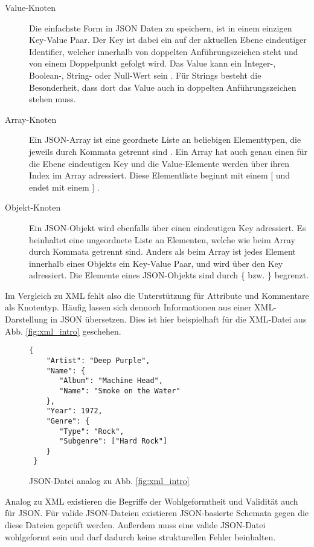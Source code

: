 \begin{description}
\item[Value-Knoten]
Die einfachste Form in JSON Daten zu speichern, ist in einem einzigen Key-Value Paar. Der Key ist dabei ein auf der aktuellen Ebene eindeutiger Identifier, welcher innerhalb von doppelten Anführungszeichen steht und von einem Doppelpunkt gefolgt wird. Das Value kann ein Integer-, Boolean-, String- oder Null-Wert sein \autocite[]{jsonSpec}. Für Strings besteht die Besonderheit, dass dort das Value auch in doppelten Anführungszeichen stehen muss.
\item[Array-Knoten]
Ein JSON-Array ist eine geordnete Liste an beliebigen Elementtypen, die jeweils durch Kommata getrennt sind \autocite[]{jsonSpec}. Ein Array hat auch genau einen für die Ebene eindeutigen Key und die Value-Elemente werden über ihren Index im Array adressiert. Diese Elementliste beginnt mit einem \glqq $[$ \grqq{} und endet mit einem \break\glqq $]$ \grqq{}.
\item[Objekt-Knoten]
Ein JSON-Objekt wird ebenfalls über einen eindeutigen Key adressiert. Es beinhaltet eine ungeordnete Liste an Elementen, welche wie beim Array durch Kommata getrennt sind. Anders als beim Array ist jedes Element innerhalb eines Objekts ein Key-Value Paar, und wird über den Key adressiert. Die Elemente eines JSON-Objekts sind durch \glqq \{ \grqq{} bzw. \glqq \} \grqq{} begrenzt.
\end{description}

Im Vergleich zu XML fehlt also die Unterstützung für Attribute und Kommentare als Knotentyp. Häufig lassen sich dennoch Informationen aus einer XML-Darstellung in JSON übersetzen. Dies ist hier beispielhaft für die XML-Datei aus Abb. \ref{fig:xml_intro} geschehen. 

\begin{figure}[!htb]
\begin{verbatim}
{
    "Artist": "Deep Purple",
    "Name": {
       "Album": "Machine Head",
       "Name": "Smoke on the Water"
    },
    "Year": 1972,
    "Genre": {
       "Type": "Rock",
       "Subgenre": ["Hard Rock"]
    }
 }
\end{verbatim}
\caption{JSON-Datei analog zu Abb. \ref{fig:xml_intro}}
\label{fig:json_intro}
\end{figure}

Analog zu XML existieren die Begriffe der Wohlgeformtheit und Validität auch für JSON. Für valide JSON-Dateien existieren JSON-basierte Schemata gegen die diese Dateien geprüft werden. Außerdem muss eine valide JSON-Datei wohlgeformt sein und darf dadurch keine strukturellen Fehler beinhalten.

